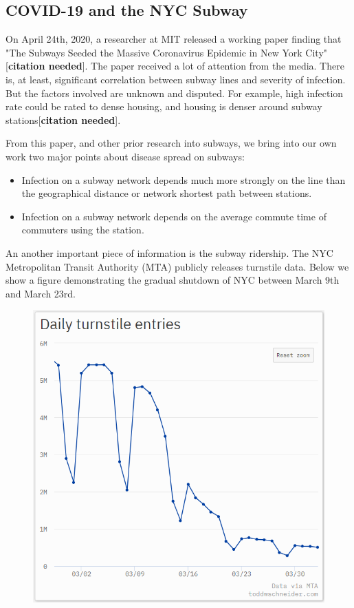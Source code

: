 \documentclass[12pt, a4, epsf] {article}
\theoremstyle{plain}
\theoremstyle{definition}
\begin{document}
\subsection*{COVID-19 and the NYC Subway}
On April 24th, 2020, a researcher at MIT released a working paper finding that "The Subways Seeded the Massive Coronavirus Epidemic in New York City"[\textbf{citation needed}]. The paper received a lot of attention from the media. There is, at least, significant correlation between subway lines and severity of infection. But the factors involved are unknown and disputed. For example, high infection rate could be rated to dense housing, and housing is denser around subway stations[\textbf{citation needed}]. 

From this paper, and other prior research into subways, we bring into our own work two major points about disease spread on subways:\\
\begin{itemize}
	\item Infection on a subway network depends much more strongly on the line than the geographical distance or network shortest path between stations.
	\item Infection on a subway network depends on the average commute time of commuters using the station.
\end{itemize}

An another important piece of information is the subway ridership. The NYC Metropolitan Transit Authority (MTA) publicly releases turnstile data. Below we show a figure demonstrating the gradual shutdown of NYC between March 9th and March 23rd.
\begin{figure}
\includegraphics[width = 1.0\textwidth]{Scratch_Visuals/schneider_ridership.png}
\end{figure}
\end{document}
